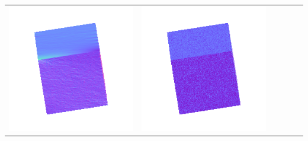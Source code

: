 \begin{tabularx}{\linewidth}{@{}Y@{}Y@{}Y@{}Y@{}Y@{}Y@{}}
\includegraphics[width=\linewidth]{semisynthetic/20160617_0_yu_out.png} &
\includegraphics[width=\linewidth]{semisynthetic/20160617_0_dpsn_out.png} &

\end{tabularx}
